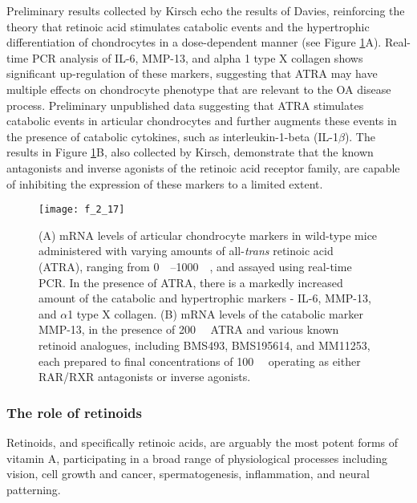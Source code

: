 \begin{refsection}
Preliminary results collected by Kirsch echo the results of Davies, reinforcing
the theory that retinoic acid stimulates catabolic events and the hypertrophic
differentiation of chondrocytes in a dose-dependent manner (see Figure
\ref{fig:kirsch_prelim_results}A). Real-time PCR analysis of IL-6, MMP-13, and
alpha 1 type X collagen shows significant up-regulation of these markers,
suggesting that ATRA may have multiple effects on chondrocyte phenotype that are
relevant to the OA disease process. Preliminary unpublished data suggesting that
ATRA stimulates catabolic events in articular chondrocytes and further augments
these events in the presence of catabolic cytokines, such as interleukin-1-beta
(IL-1${\beta}$). The results in Figure \ref{fig:kirsch_prelim_results}B, also
collected by Kirsch, demonstrate that the known antagonists and inverse agonists
of the retinoic acid receptor family,\cite{DeLera2007} are capable of inhibiting
the expression of these markers to a limited extent. 

\begin{figure}[h!] \centering \texttt{[image: f\_2\_17]}
    \caption{(A) mRNA levels of articular chondrocyte markers in wild-type mice
    administered with varying amounts of all-\emph{trans} retinoic acid (ATRA),
    ranging from \SIrange{0}{1000}{\nano\moLar}, and assayed using real-time
    PCR. In the presence of ATRA, there is a markedly increased amount of the
    catabolic and hypertrophic markers - IL-6, MMP-13, and ${\alpha}$1 type X
    collagen. (B) mRNA levels of the catabolic marker MMP-13, in the presence of
    \SI{200}{\nano\moLar} ATRA and various known retinoid analogues, including
    BMS493, BMS195614, and MM11253, each prepared to final concentrations of
    \SI{100}{\nano\moLar} operating as either RAR/RXR antagonists or inverse
    agonists.}
    \label{fig:kirsch_prelim_results} \end{figure}

\subsubsection{The role of retinoids}

Retinoids, and specifically retinoic acids, are arguably the most potent forms
of vitamin A, participating in a broad range of physiological processes
including vision,\cite{Hyatt1996} cell growth and cancer,\cite{Mongan2007}
spermatogenesis,\cite{Vernet2006} inflammation,\cite{Huang2007} and
neural patterning.\cite{Abu-Abed2001}


\end{refsection}
